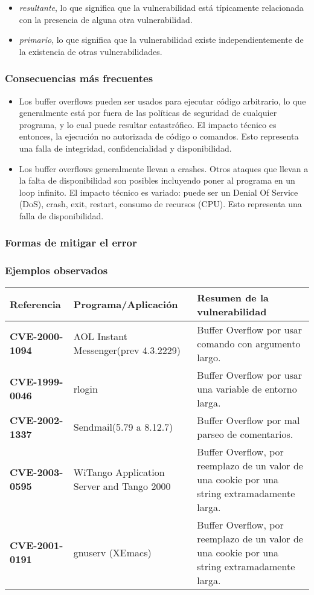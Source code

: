 \begin{itemize}
    \item \textit{resultante}, lo que significa que la vulnerabilidad está típicamente relacionada con la presencia de alguna otra vulnerabilidad.
    \item \textit{primario}, lo que significa que la vulnerabilidad existe independientemente de la existencia de otras vulnerabilidades.
\end{itemize}

\subsubsection{Consecuencias más frecuentes}

\begin{itemize}
    \item Los buffer overflows pueden ser usados para ejecutar código arbitrario, lo que generalmente está por fuera de las políticas de seguridad de cualquier programa, 
     y lo cual puede resultar catastrófico. El impacto técnico es entonces, la ejecución no autorizada de código o comandos. Esto representa una falla de integridad, 
    confidencialidad y disponibilidad.
    \item Los buffer overflows generalmente llevan a crashes. Otros ataques que llevan a la falta de disponibilidad son posibles incluyendo poner al programa en un loop infinito.
    El impacto técnico es variado: puede ser un Denial Of Service (DoS), crash, exit, restart, consumo de recursos (CPU). Esto representa una falla de disponibilidad.
\end{itemize}

\subsubsection{Formas de mitigar el error}

\subsubsection{Ejemplos observados}

\begin{tabular}[\baselineskip]{|p{1.75cm}|p{3.5cm}|p{8cm}|}
  \hline
  \textbf{Referencia} & Programa/Aplicación & Resumen de la vulnerabilidad \\
  \hline
  \textbf{CVE-2000- 1094} & AOL Instant Messenger(prev 4.3.2229) & Buffer Overflow por usar comando con argumento largo. \\
  \hline
  \textbf{CVE-1999- 0046} & rlogin & Buffer Overflow por usar una variable de entorno larga. \\
  \hline
  \textbf{CVE-2002- 1337} & Sendmail(5.79 a 8.12.7) & Buffer Overflow por mal parseo de comentarios. \\
  \hline
  \textbf{CVE-2003- 0595} & WiTango Application Server and Tango 2000 & Buffer Overflow, por reemplazo de un valor de una cookie por una string extramadamente larga.\\
  \hline
  \textbf{CVE-2001- 0191} & gnuserv (XEmacs) & Buffer Overflow, por reemplazo de un valor de una cookie por una string extramadamente larga. \\
  \hline
\end{tabular}